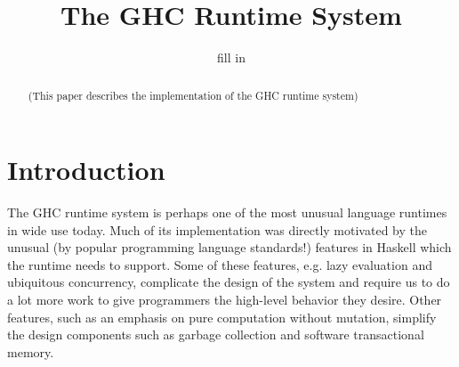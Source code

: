 \documentclass{jfp1}
\title{The GHC Runtime System}
\author{fill in}
\begin{document}
\maketitle

\begin{abstract}
(This paper describes the implementation of the GHC runtime system)
\end{abstract}

\tableofcontents

\section{Introduction}

The GHC runtime system is perhaps one of the most unusual language
runtimes in wide use today.  Much of its implementation was directly
motivated by the unusual (by popular programming language standards!)
features in Haskell which the runtime needs to support.  Some of these
features, e.g. lazy evaluation and ubiquitous concurrency, complicate
the design of the system and require us to do a lot more work to give
programmers the high-level behavior they desire.  Other features, such
as an emphasis on pure computation without mutation, simplify the design
components such as garbage collection and software transactional memory.







\end{document}
